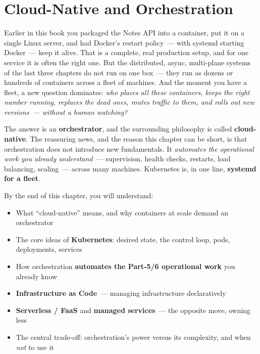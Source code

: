 \setcounter{chapter}{42}
\chapter{Cloud-Native and Orchestration}\label{ch:43-cloud-native-orchestration}

\chapterrule

Earlier in this book you packaged the Notes API into a container, put it on a single Linux server, and had Docker's restart policy~--- with systemd starting Docker~--- keep it alive. That is a complete, real production setup, and for one service it is often the right one. But the distributed, async, multi-plane systems of the last three chapters do not run on one box~--- they run as dozens or hundreds of containers across a fleet of machines. And the moment you have a fleet, a new question dominates: \emph{who places all these containers, keeps the right number running, replaces the dead ones, routes traffic to them, and rolls out new versions~--- without a human watching?}

The answer is an \textbf{orchestrator}, and the surrounding philosophy is called \textbf{cloud-native}. The reassuring news, and the reason this chapter can be short, is that orchestration does not introduce new fundamentals. It \emph{automates the operational work you already understand}~--- supervision, health checks, restarts, load balancing, scaling~--- across many machines. Kubernetes is, in one line, \textbf{systemd for a fleet}.

\begin{objectives}

By the end of this chapter, you will understand:

\begin{itemize}
\tightlist
\item
  What ``cloud-native'' means, and why containers at scale demand an orchestrator
\item
  The core ideas of \textbf{Kubernetes}: desired state, the control loop, pods, deployments, services
\item
  How orchestration \textbf{automates the Part-5/6 operational work} you already know
\item
  \textbf{Infrastructure as Code}~--- managing infrastructure declaratively
\item
  \textbf{Serverless / FaaS} and \textbf{managed services}~--- the opposite move, owning less
\item
  The central trade-off: orchestration's power versus its complexity, and when \emph{not} to use it
\end{itemize}

\end{objectives}

